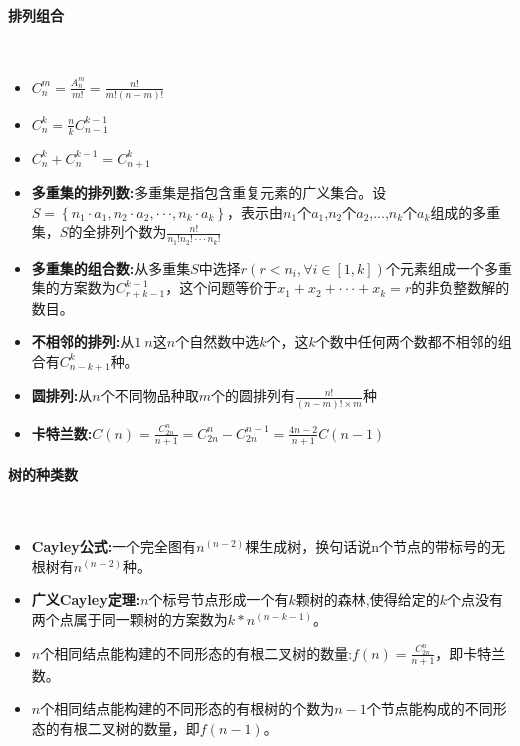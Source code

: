 \paragraph{排列组合}~{}
\\
\begin{itemize}
\item $C_{n}^{m}=\frac{A_{n}^{m}}{m!}=\frac{n!}{m!(n-m)!}$
\item $C_{n}^{k}=\frac{n}{k}C_{n-1}^{k-1}$
\item $C_{n}^{k}+C_{n}^{k-1}=C_{n+1}^{k}$
\item \textbf{多重集的排列数:}多重集是指包含重复元素的广义集合。设$S= \left\{ n_1 \cdot a_1,n_2 \cdot a_2, \cdot \cdot \cdot,n_k \cdot a_k \right\}$，表示由$n_1$个$a_1$,$n_2$个$a_2$,...,$n_k$个$a_k$组成的多重集，$S$的全排列个数为$\frac{n!}{n_1!n_2! \cdot \cdot \cdot n_k!}$
\item \textbf{多重集的组合数:}从多重集$S$中选择$r(r<n_i,\forall i \in [1, k])$个元素组成一个多重集的方案数为$C_{r+k-1}^{k-1}$，这个问题等价于$x_1+x_2+ \cdot \cdot \cdot +x_k=r$的非负整数解的数目。
\item \textbf{不相邻的排列:}从$1~n$这$n$个自然数中选$k$个，这$k$个数中任何两个数都不相邻的组合有$C_{n-k+1}^{k}$种。
\item \textbf{圆排列:}从$n$个不同物品种取$m$个的圆排列有$\frac{n!}{(n-m)! \times m}$种
\item \textbf{卡特兰数:}$C(n)=\frac{C_{2n}^{n}}{n+1}=C_{2n}^{n}-C_{2n}^{n-1}=\frac{4n-2}{n+1}C(n-1)$
\end{itemize}


\paragraph{树的种类数}~{}
\\
\begin{itemize}
\item \textbf{Cayley公式:}一个完全图有$n^{(n-2)}$棵生成树，换句话说n个节点的带标号的无根树有$n^{(n-2)}$种。
\item \textbf{广义Cayley定理:}$n$个标号节点形成一个有$k$颗树的森林,使得给定的$k$个点没有两个点属于同一颗树的方案数为$k*n^{(n−k−1)}$。
\item $n$个相同结点能构建的不同形态的有根二叉树的数量:$f(n)=\frac{C_{2n}^{n}}{n+1}$，即卡特兰数。
\item $n$个相同结点能构建的不同形态的有根树的个数为$n-1$个节点能构成的不同形态的有根二叉树的数量，即$f(n-1)$。
\end{itemize}